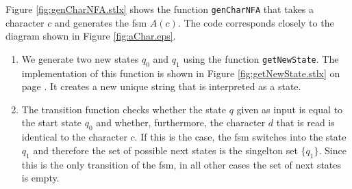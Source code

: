 \begin{enumerate}
      Figure \ref{fig:genCharNFA.stlx} shows the function \texttt{genCharNFA} that takes a
      character $c$ and generates the fsm $A(c)$.  The code corresponds closely to the
      diagram shown in Figure \ref{fig:aChar.eps}.
      \begin{enumerate}
      \item We generate two new states $q_0$ and $q_1$ using the function
            \texttt{getNewState}.  The implementation of this function is shown in Figure
            \ref{fig:getNewState.stlx} on page \pageref{fig:getNewState.stlx}.  It creates a new 
            unique string that is interpreted as a state.
      \item The transition function checks whether the state $q$ given as input is equal
            to the start state $q_0$ and whether, furthermore, the character $d$ that is
            read is identical to the character $c$.  If this is the case, the fsm switches
            into the state $q_1$ and therefore the set of possible next states is the singelton
            set $\{ q_1 \}$.  Since this is the only transition of the fsm, in all other
            cases the set of next states is empty.
      \end{enumerate}
      

\end{enumerate}
